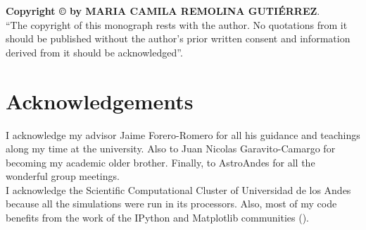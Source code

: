 \vspace{4in}
\noindent \textbf{Copyright \copyright{} by MARIA CAMILA REMOLINA GUTI\'ERREZ}.\\
``The copyright of this monograph rests with the author.  No quotations
from it should be published without the author's prior written consent
and information derived from it should be acknowledged''.

\chapter*{Acknowledgements}
I acknowledge my advisor Jaime Forero-Romero for all his guidance and teachings along my time at the university. Also to Juan Nicolas Garavito-Camargo for becoming my academic older brother. Finally, to AstroAndes for all the wonderful group meetings. \\

I acknowledge the Scientific Computational Cluster of Universidad de los Andes because all the simulations were run in its processors. Also, most of my code benefits from the work of the IPython and Matplotlib communities (\cite{IPython,matplotlib}).\\

\tableofcontents
\clearpage